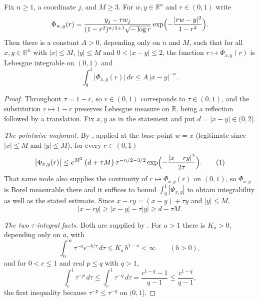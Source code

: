\begin{lemma}
Fix $n \geq 1$, a coordinate $j$, and $M \geq 3$.  For $w,y \in \mathbb{R}^n$ and
$r \in (0,1)$ write
\[
  \Phi_{w,y}(r) = \frac{y_j - rw_j}{(1-r^2)^{n/2+1}\sqrt{-\log r}}
    \exp\Bigl(-\frac{|rw-y|^2}{1-r^2}\Bigr) .
\]
Then there is a constant $A > 0$, depending only on $n$ and $M$, such that for all
$x,y \in \mathbb{R}^n$ with $|x| \leq M$, $|y| \leq M$ and $0 < |x-y| \leq 2$, the
function $r \mapsto \Phi_{x,y}(r)$ is Lebesgue integrable on $(0,1)$ and
\[
  \int_0^1 \bigl|\Phi_{x,y}(r)\bigr|\,dr \leq A\,|x-y|^{-n} .
\]
\end{lemma}
\begin{proof}
Throughout $\tau = 1-r$, so $r \in (0,1)$ corresponds to $\tau \in (0,1)$, and the
substitution $r \mapsto 1-r$ preserves Lebesgue measure on $\mathbb{R}$, being a
reflection followed by a translation.  Fix $x,y$ as in the statement and put
$d = |x-y| \in (0,2]$.

\emph{The pointwise majorant.}
By , applied at the base point $w = x$
(legitimate since $|x| \leq M$ and $|y| \leq M$), for every $r \in (0,1)$
\begin{equation*}
  \bigl|\Phi_{x,y}(r)\bigr|
    \leq e^{M^2}\,\bigl(d + \tau M\bigr)\,\tau^{-n/2-3/2}
      \exp\Bigl(-\frac{|x-ry|^2}{2\tau}\Bigr) . \tag{1}
\end{equation*}
That same node also supplies the continuity of $r \mapsto \Phi_{x,y}(r)$ on
$(0,1)$, so $\Phi_{x,y}$ is Borel measurable there and it suffices to bound
$\int_0^1|\Phi_{x,y}|$ to obtain integrability as well as the stated estimate.
Since $x - ry = (x-y) + \tau y$ and $|y| \leq M$,
\begin{equation*}
  |x-ry| \geq |x-y| - \tau|y| \geq d - \tau M . \tag{2}
\end{equation*}

\emph{The two $\tau$-integral facts.}
Both are supplied by .  For $a > 1$ there is
$K_a > 0$, depending only on $a$, with
\begin{equation*}
  \int_0^\infty \tau^{-a}e^{-b/\tau}\,d\tau \leq K_a\,b^{1-a} < \infty
  \qquad (b > 0) , \tag{3}
\end{equation*}
and for $0 < c \leq 1$ and real $p \leq q$ with $q > 1$,
\begin{equation*}
  \int_c^1\tau^{-p}\,d\tau \leq \int_c^1\tau^{-q}\,d\tau
    = \frac{c^{1-q}-1}{q-1} \leq \frac{c^{1-q}}{q-1} , \tag{4}
\end{equation*}
the first inequality because $\tau^{-p} \leq \tau^{-q}$ on $(0,1]$.


\end{proof}
